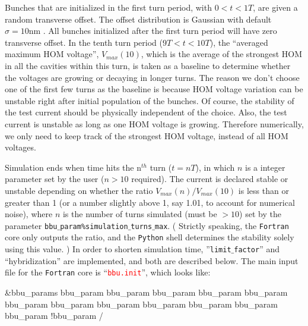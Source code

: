 \documentclass{hitec}
\begin{document}
Bunches that are initialized in the first turn period, with $0 < t <1T$, are given a random transverse offset. The offset distribution is Gaussian with default $\sigma = 10 \text{nm}$ . All bunches initialized after the first turn period will have zero transverse offset. In the tenth turn period ($9T < t < 10T$), the ``averaged maximum HOM voltage'', $V_{max}(10)$, which is the average of the strongest HOM in all the cavities within this turn, is taken as a baseline to determine whether the voltages are growing or decaying in longer turns. The reason we don't choose one of the first few turns as the baseline is because HOM voltage variation can be unstable right after initial population of the bunches. Of course, the stability of the test current should be physically independent of the choice. Also, the test current is unstable as long as one HOM voltage is growing. Therefore numerically, we only need to keep track of the strongest HOM voltage, instead of all HOM voltages.

Simulation ends when time hits the n$^{th}$ turn ($t = nT$), in which $n$ is a integer parameter set by the user ($n>10$ required). The current is declared stable or unstable depending on whether the ratio $V_{max}(n)/V_{max}(10)$ is less than or greater than 1 (or a number slightly above 1, say 1.01, to account for numerical noise), where $n$ is the number of
turns simulated (must be $>10$) set by the parameter \texttt{bbu$\_$param\%simulation$\_$turns$\_$max}. ( Strictly speaking, the \texttt{Fortran} core only outputs the ratio, and the \texttt{Python} shell determines the stability solely using this value. ) In order to shorten simulation time, ''\texttt{limit$\_$factor}'' and ``hybridization'' are implemented, and both are described below.
\bigbreak
The main input file for the \texttt{Fortran} core is ``\textcolor{red}{\texttt{bbu.init}}'', which looks like:
\begin{code}
&bbu_params 
bbu_param%
bbu_param%
bbu_param%
bbu_param%
bbu_param%
bbu_param%
bbu_param%
bbu_param%
bbu_param%
bbu_param%
bbu_param%
bbu_param%
!bbu_param%
/
\end{code}
\end{document}
